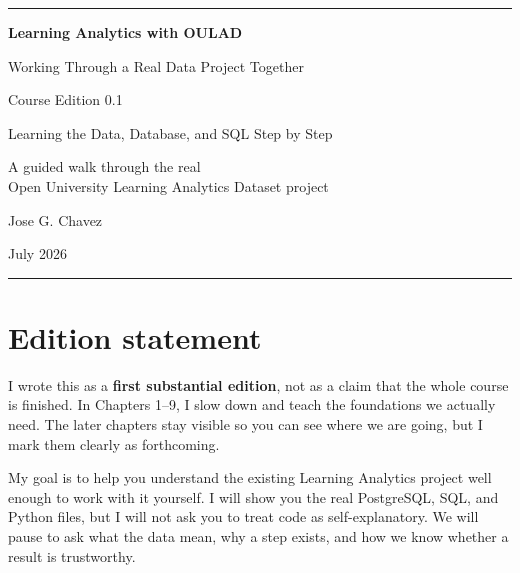 \documentclass[11pt,openany]{book}
\begin{document}
\hypersetup{pageanchor=false}
\begin{titlepage}
  \centering
  \vspace*{0.9in}
  {\color{CourseGold}\rule{\textwidth}{1.2pt}\par}
  \vspace{0.45in}
  {\Huge\bfseries\color{CourseInk}Learning Analytics with OULAD\par}
  \vspace{0.2in}
  {\LARGE\color{CourseRed}Working Through a Real Data Project Together\par}
  \vspace{0.55in}
  {\Large Course Edition 0.1\par}
  \vspace{0.08in}
  {\large Learning the Data, Database, and SQL Step by Step\par}
  \vfill
  {\large A guided walk through the real\\
  Open University Learning Analytics Dataset project\par}
  \vspace{0.45in}
  {\large Jose G. Chavez\par}
  \vspace{0.12in}
  {\normalsize July 2026\par}
  \vspace{0.45in}
  {\color{CourseGold}\rule{\textwidth}{1.2pt}\par}
\end{titlepage}

\frontmatter
\hypersetup{pageanchor=true}

\chapter*{Edition statement}
\begin{editionnote}
I wrote this as a \textbf{first substantial edition}, not as a claim that the
whole course is finished. In Chapters 1--9, I slow down and teach the
foundations we actually need. The later chapters stay visible so you can see
where we are going, but I mark them clearly as forthcoming.
\end{editionnote}

My goal is to help you understand the existing Learning Analytics project well
enough to work with it yourself. I will show you the real PostgreSQL, SQL, and
Python files, but I will not ask you to treat code as self-explanatory. We will
pause to ask what the data mean, why a step exists, and how we know whether a
result is trustworthy.
\end{document}
